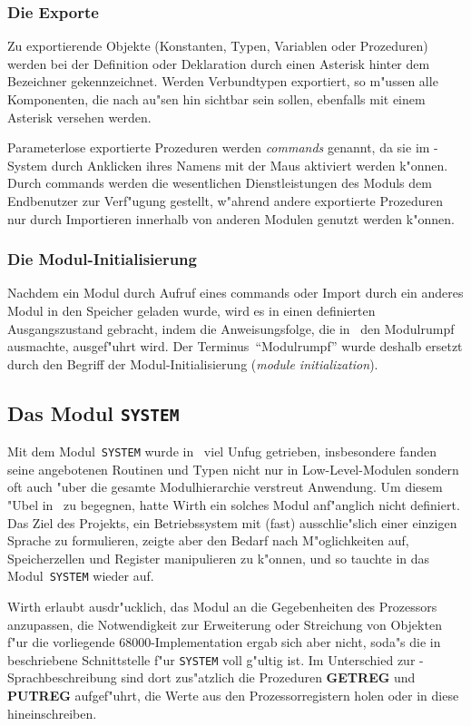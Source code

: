 \subsubsection{Die Exporte}

Zu exportierende Objekte (Konstanten, Typen, Variablen oder Prozeduren) werden
bei der Definition oder Deklaration durch einen Asterisk hinter dem Bezeichner
gekennzeichnet.
Werden Verbundtypen exportiert, so m"ussen alle Komponenten, die nach au"sen
hin sichtbar sein sollen, ebenfalls mit einem Asterisk versehen werden.

Parameterlose exportierte Prozeduren werden {\it commands\/} genannt, da sie im \oberon-System
durch Anklicken ihres Namens mit der Maus aktiviert werden k"onnen.
Durch commands werden die wesentlichen Dienstleistungen des Moduls dem
Endbenutzer zur Verf"ugung gestellt, w"ahrend andere exportierte Prozeduren
nur durch Importieren innerhalb von anderen Modulen genutzt werden k"onnen.

\subsubsection{Die Modul-Initialisierung}

Nachdem ein Modul durch Aufruf eines commands oder Import durch ein anderes Modul
in den Speicher geladen wurde, wird es in einen definierten Ausgangszustand
gebracht, indem die Anweisungsfolge, die in \modula\ den Modulrumpf ausmachte,
ausgef"uhrt wird.
Der Terminus~"`Modulrumpf"' wurde deshalb ersetzt durch den Begriff der
Modul-Initialisierung ({\it module initialization\/}).

\subsection{Das Modul {\tt SYSTEM}}

Mit dem Modul~{\tt SYSTEM} wurde in \modula\ viel Unfug getrieben, insbesondere
fanden seine angebotenen Routinen und Typen nicht nur in Low-Level-Modulen sondern
oft auch "uber die gesamte Modulhierarchie verstreut Anwendung.
Um diesem "Ubel in \oberon\ zu begegnen, hatte Wirth ein solches Modul anf"anglich
nicht definiert.
Das Ziel des Projekts, ein Betriebssystem mit (fast) ausschlie"slich einer einzigen
Sprache zu formulieren, zeigte aber den Bedarf nach M"oglichkeiten auf,
Speicherzellen und Register manipulieren zu k"onnen, und so tauchte in
\cite{oberon1} das Modul~{\tt SYSTEM} wieder auf.

Wirth erlaubt ausdr"ucklich, das Modul an die Gegebenheiten des Prozessors
anzupassen, die Notwendigkeit zur Erweiterung oder Streichung von Objekten
f"ur die vorliegende 68000-Implementation ergab sich aber nicht, soda"s
die in \cite{op2doc} beschriebene Schnittstelle f"ur {\tt SYSTEM} voll
g"ultig ist.
Im Unterschied zur \oberon-Sprachbeschreibung sind dort zus"atzlich die
Prozeduren {\bf GETREG} und {\bf PUTREG} aufgef"uhrt, die Werte aus
den Prozessorregistern holen oder in diese hineinschreiben.

